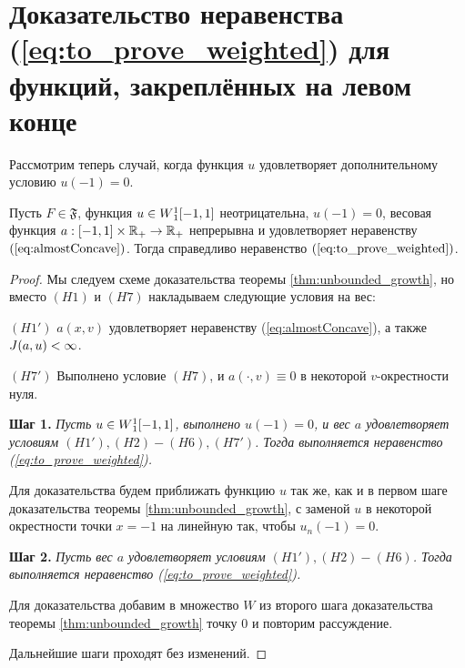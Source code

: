 \section{Доказательство неравенства (\ref{eq:to_prove_weighted}) для функций, закреплённых на левом конце}
\label{sec:sobolev_pinned}

Рассмотрим теперь случай, когда функция $u$ удовлетворяет дополнительному условию $u(-1) = 0$.
\begin{thm}
Пусть $F \in \mathfrak{F}$, функция $u \in W{}_1^1[-1, 1]$ неотрицательна, $u(-1) = 0$,
весовая функция $a: [-1, 1] \times \mathbb R_+ \to \mathbb R_+$ непрерывна и удовлетворяет неравенству $(\ref{eq:almostConcave})$.
Тогда справедливо неравенство $(\ref{eq:to_prove_weighted})$.
\end{thm}

\begin{proof}
Мы следуем схеме доказательства теоремы \ref{thm:unbounded_growth},
но вместо $(H1)$ и $(H7)$ накладываем следующие условия на вес:

\bigskip
\noindent
$(H1')$ $a(x, v)$ удовлетворяет неравенству (\ref{eq:almostConcave}), а также $J(a, u) < \infty$.

\bigskip
\noindent
$(H7')$ Выполнено условие $(H7)$, и $a(\cdot, v) \equiv 0$ в некоторой $v$-окрестности нуля.

\bigskip
\textbf{Шаг 1.}
\textit{Пусть $u \in W{}_1^1[-1, 1]$, выполнено $u(-1) = 0$, и вес $a$ удовлетворяет условиям $(H1'), (H2)-(H6), (H7')$.
Тогда выполняется неравенство (\ref{eq:to_prove_weighted}).}

Для доказательства будем приближать функцию $u$ так же, как и в первом шаге доказательства теоремы \ref{thm:unbounded_growth},
с заменой $u$ в некоторой окрестности точки $x = -1$ на линейную так, чтобы $u_n(-1) = 0$.

\bigskip
\textbf{Шаг 2.}
\textit{Пусть вес $a$ удовлетворяет условиям $(H1'), (H2)-(H6)$.
Тогда выполняется неравенство (\ref{eq:to_prove_weighted}).}

Для доказательства добавим в множество $W$ из второго шага доказательства теоремы \ref{thm:unbounded_growth} точку $0$
и повторим рассуждение.

\medskip

Дальнейшие шаги проходят без изменений.
\end{proof}
